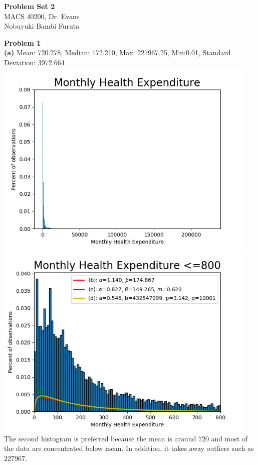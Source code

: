 \documentclass[letterpaper,12pt]{article}
\theoremstyle{definition}
\begin{document}
\begin{flushleft}
  \textbf{\large{Problem Set 2}} \\
  MACS 40200, Dr. Evans \\
  Nobuyuki Bambi Furuta
\end{flushleft}

\vspace{5mm}

\noindent\textbf{Problem 1}\\
\textbf{(a)} Mean: 720.278, Median: 172.210, Max: 227967.25, Min:0.01, Standard Deviation: 3972.664\\
\includegraphics[width=5in]{ps2hist1}\\
\includegraphics[width=5in]{ps2hist}\\
The second histogram is preferred because the mean is around 720 and most of the data are concentrated below mean. In addition, it takes away outliers such as 227967.\\ \\
\end{document}
